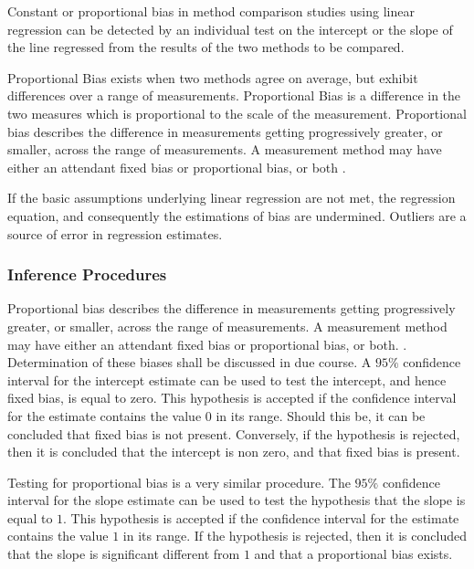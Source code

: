 \documentclass[12pt, a4paper]{report}
\theoremstyle{plain}
\theoremstyle{definition}
\theoremstyle{remark}
\begin{document}
Constant or proportional bias in method comparison studies using linear regression can be detected by an individual test on the intercept or the slope of the line regressed from the results of the two methods to be compared.


Proportional Bias exists when two methods agree on average, but exhibit differences over a range of measurements. Proportional Bias is a difference in the two measures which is proportional to the scale of the measurement.
Proportional bias describes the difference in measurements getting progressively greater, or smaller, across the range of measurements. A measurement method may have either an attendant fixed bias or proportional bias, or both \citep{ludbrook02}.

If the basic assumptions underlying linear regression are not met, the regression equation, and consequently the estimations of bias are undermined. Outliers are a source of error in regression estimates.

 
\subsubsection{Inference Procedures}

Proportional bias describes the difference in measurements getting progressively greater, or smaller, across the range of measurements. A measurement method may have either an attendant fixed bias or proportional bias, or both. \citep{ludbrook}. Determination of these biases shall be discussed in due course.
	A $95\%$ confidence interval for the intercept estimate can be used to test the intercept, and hence fixed bias, is equal to
	zero. This hypothesis is accepted if the confidence interval for the estimate contains the value $0$ in its range. Should this be,
	it can be concluded that fixed bias is not present. Conversely, if the hypothesis is rejected, then it is concluded that the
	intercept is non zero, and that fixed bias is present.
	
	Testing for proportional bias is a very similar procedure. The
	$95\%$ confidence interval for the slope estimate can be used to
	test the hypothesis that the slope is equal to $1$. This
	hypothesis is accepted if the confidence interval for the estimate
	contains the value $1$ in its range. If the hypothesis is
	rejected, then it is concluded that the slope is significant
	different from $1$ and that a proportional bias exists.
	
\end{document}
